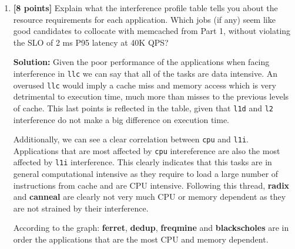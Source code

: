 \begin{enumerate}
\begin{enumerate}
         considering a more detail, per application, look we can notice that \textbf{vips} is the most resource demanding task as it is affected by all sources of interference. The least resource demanding tasks are \textbf{radix} and \textbf{canneal} this could imply that they are neither very CPU or data dependent. Nevertheless, some critical data should always be accessed and, as a consequence, the penalty of accessing memory after interference to \texttt{llc} is still noticeable. There are some similarities between \textbf{blackscholes}, \textbf{dedup}, \textbf{ferret}, and \textbf{freqmine} as they are all visibly CPU and data dependent with noticeable drops in performance, although the least affected one is \textbf{blackscholes}.
    

        \item \textbf{[8 points]} Explain what the interference profile table tells you about the resource requirements for each application. Which jobs (if any) seem like good candidates to collocate with memcached from Part 1, without violating the SLO of 2 ms P95 latency at 40K QPS?

        \textbf{Solution:} Given the poor performance of the applications when facing interference in \texttt{llc} we can say that all of the tasks are data intensive. An overused \texttt{llc} would imply a cache miss and memory access which is very detrimental to execution time, much more than misses to the previous levels of cache. This last points is reflected in the table, given that \texttt{l1d} and \texttt{l2} interference do not make a big difference on execution time. 
        
        Additionally, we can see a clear correlation between \texttt{cpu} and \texttt{l1i}. Applications that are most affected by \texttt{cpu} intereference are also the most affected by \texttt{l1i} interference. This clearly indicates that this tasks are in general computational intensive as they require to load a large number of instructions from cache and are CPU intensive. Following this thread, \textbf{radix} and \textbf{canneal} are clearly not very much CPU or memory dependent as they are not strained by their interference.

        According to the graph: \textbf{ferret}, \textbf{dedup}, \textbf{freqmine} and \textbf{blackscholes} are in order the applications that are the most CPU and memory dependent.
        

\end{enumerate}
\end{enumerate}

